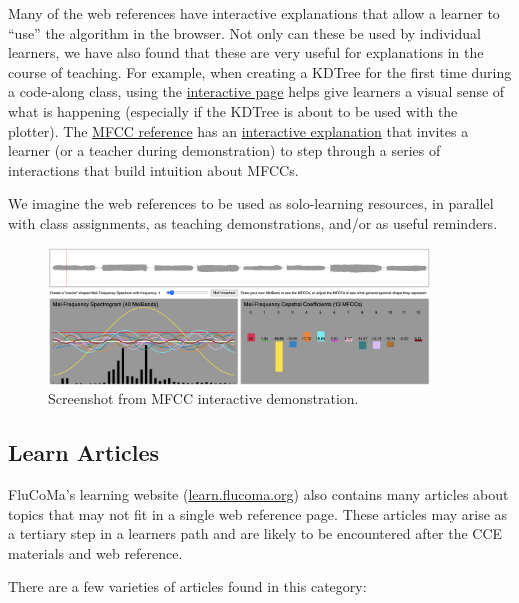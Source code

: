 \documentclass{article}
\begin{document}
Many of the web references have interactive explanations that allow a
learner to ``use'' the algorithm in the browser. Not only can these be
used by individual learners, we have also found that these are very
useful for explanations in the course of teaching. For example, when
creating a KDTree for the first time during a code-along class, using
the \href{https://learn.flucoma.org/reference/kdtree/}{interactive page}
helps give learners a visual sense of what is happening (especially if
the KDTree is about to be used with the plotter). The
\href{https://learn.flucoma.org/reference/mfcc/}{MFCC reference} has an
\href{https://learn.flucoma.org/reference/mfcc/explain/}{interactive
explanation} that invites a learner (or a teacher during demonstration)
to step through a series of interactions that build intuition about
MFCCs.

We imagine the web references to be used as solo-learning resources, in
parallel with class assignments, as teaching demonstrations, and/or as
useful reminders.

\begin{figure}[H]
\centering
\includegraphics[width=0.9\textwidth]{./figures/mfcc-interactive-demonstration.png}
\caption{Screenshot from MFCC interactive demonstration.}
\label{fig:mfcc-interactive-demonstration}
\end{figure}

\subsection{Learn Articles}\label{learn-articles}

FluCoMa's learning website
(\href{https://learn.flucoma.org}{learn.flucoma.org}) also contains many
articles about topics that may not fit in a single web reference page.
These articles may arise as a tertiary step in a learners path and are
likely to be encountered after the CCE materials and web reference.

There are a few varieties of articles found in this category:
\end{document}
